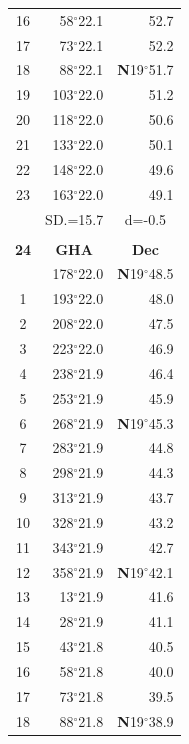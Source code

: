 \documentclass[10pt, a4paper]{report}
\begin{document}
\begin{scriptsize}
\begin{tabular*}{0.2\textwidth}[t]{@{\extracolsep{\fill}}|c|rr|}
16 & 58$^\circ$22.1 & 52.7\\
17 & 73$^\circ$22.1 & 52.2\\[2Pt]
18 & 88$^\circ$22.1 & \textbf{N}19$^\circ$51.7\\
19 & 103$^\circ$22.0 & 51.2\\
20 & 118$^\circ$22.0 & 50.6\\
21 & 133$^\circ$22.0 & \raisebox{0.24ex}{\boldmath$\cdot$~\boldmath$\cdot$~~}50.1\\
22 & 148$^\circ$22.0 & 49.6\\
23 & 163$^\circ$22.0 & 49.1\\
\hline
\rule{0pt}{2.4ex} & \multicolumn{1}{c}{SD.=15.7} & \multicolumn{1}{c|}{d=-0.5}\\
\hline
\multicolumn{1}{c}{}\\[-0.5ex]\hline
\multicolumn{1}{|c|}{\rule{0pt}{2.6ex}\textbf{24}} & \multicolumn{1}{c}{\textbf{GHA}} & \multicolumn{1}{c|}{\textbf{Dec}}\\
\hline\rule{0pt}{2.6ex}\noindent
0 & 178$^\circ$22.0 & \textbf{N}19$^\circ$48.5\\
1 & 193$^\circ$22.0 & 48.0\\
2 & 208$^\circ$22.0 & 47.5\\
3 & 223$^\circ$22.0 & \raisebox{0.24ex}{\boldmath$\cdot$~\boldmath$\cdot$~~}46.9\\
4 & 238$^\circ$21.9 & 46.4\\
5 & 253$^\circ$21.9 & 45.9\\[2Pt]
6 & 268$^\circ$21.9 & \textbf{N}19$^\circ$45.3\\
7 & 283$^\circ$21.9 & 44.8\\
8 & 298$^\circ$21.9 & 44.3\\
9 & 313$^\circ$21.9 & \raisebox{0.24ex}{\boldmath$\cdot$~\boldmath$\cdot$~~}43.7\\
10 & 328$^\circ$21.9 & 43.2\\
11 & 343$^\circ$21.9 & 42.7\\[2Pt]
12 & 358$^\circ$21.9 & \textbf{N}19$^\circ$42.1\\
13 & 13$^\circ$21.9 & 41.6\\
14 & 28$^\circ$21.9 & 41.1\\
15 & 43$^\circ$21.8 & \raisebox{0.24ex}{\boldmath$\cdot$~\boldmath$\cdot$~~}40.5\\
16 & 58$^\circ$21.8 & 40.0\\
17 & 73$^\circ$21.8 & 39.5\\[2Pt]
18 & 88$^\circ$21.8 & \textbf{N}19$^\circ$38.9\\

\end{tabular*}
\end{scriptsize}
\end{document}
